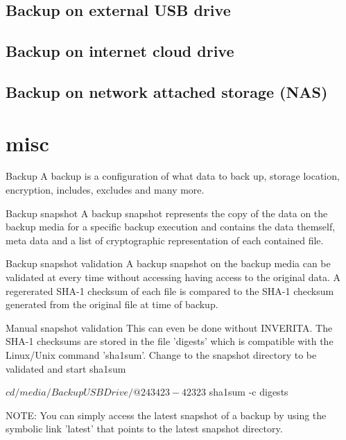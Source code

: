 \subsection{Backup on external USB drive}

\subsection{Backup on internet cloud drive}

\subsection{Backup on network attached storage (NAS)}


\section{misc}

Backup
A backup is a configuration of what data to back up, storage location,
encryption, includes, excludes and many more.

Backup snapshot
A backup snapshot represents the copy of the data on the backup media
for a specific backup execution and contains the data themself, meta data
and a list of cryptographic representation of each contained file.

Backup snapshot validation
A backup snapshot on the backup media can be validated at every time
without accessing having access to the original data. A regererated SHA-1
checksum of each file is compared to the SHA-1 checksum generated from the
original file at time of backup.

Manual snapshot validation
This can even be done without INVERITA. The SHA-1 checksums are stored
in the file 'digests' which is compatible with the Linux/Unix command 'sha1sum'.
Change to the snapshot directory to be validated and start sha1sum

\begin{console}
$ cd /media/BackupUSBDrive/@243423-42323
$ sha1sum -c digests
\end{console}

NOTE: You can simply access the latest snapshot of a backup by using the
      symbolic link 'latest' that points to the latest snapshot directory.

